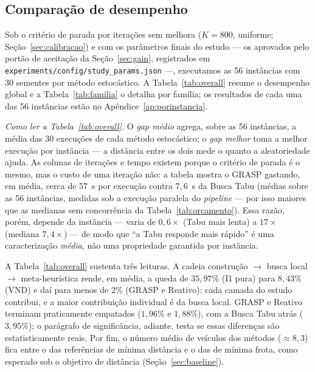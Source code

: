 \documentclass[12pt, a4paper]{article}
\newcommand{\Kgrasp}{800}
\begin{document}
\subsection{Comparação de desempenho}\label{sec:comparacao}
Sob o critério de parada por iterações sem melhora ($K=\Kgrasp$, uniforme; Seção~\ref{sec:calibracao}) e com os parâmetros finais do estudo --- os aprovados pelo portão de aceitação da Seção~\ref{sec:gain}, registrados em \texttt{experiments/config/study\_params.json} ---, executamos as 56 instâncias com 30 sementes por método estocástico. A Tabela~\ref{tab:overall} resume o desempenho global e a Tabela~\ref{tab:familia} o detalha por família; os resultados de cada uma das 56 instâncias estão no Apêndice~\ref{ap:porinstancia}.



\emph{Como ler a Tabela~\ref{tab:overall}.} O \emph{gap médio} agrega, sobre as 56 instâncias, a média das 30 execuções de cada método estocástico; o \emph{gap melhor} toma a melhor execução por instância --- a distância entre os dois mede o quanto a aleatoriedade ajuda. As colunas de iterações e tempo existem porque o critério de parada é o mesmo, mas o custo de uma iteração não: a tabela mostra o GRASP gastando, em média, cerca de $57$~s por execução contra $7{,}6$~s da Busca Tabu (médias sobre as 56 instâncias, medidas sob a execução paralela do \emph{pipeline} --- por isso maiores que as medianas sem concorrência da Tabela~\ref{tab:orcamento}). Essa razão, porém, depende da instância --- varia de $0{,}6\times$ (Tabu mais lenta) a $17\times$ (mediana $7{,}4\times$) --- de modo que ``a Tabu responde mais rápido'' é uma caracterização \emph{média}, não uma propriedade garantida por instância.

A Tabela~\ref{tab:overall} sustenta três leituras. A cadeia construção $\rightarrow$ busca local $\rightarrow$ meta-heurística rende, em média, a queda de $35{,}97\%$ (I1 pura) para $8{,}43\%$ (VND) e daí para menos de $2\%$ (GRASP e Reativo): cada camada do estudo contribui, e a maior contribuição individual é da busca local. GRASP e Reativo terminam praticamente empatados ($1{,}96\%$ e $1{,}88\%$), com a Busca Tabu atrás ($3{,}95\%$); o parágrafo de significância, adiante, testa se essas diferenças são estatisticamente reais. Por fim, o número médio de veículos dos métodos ($\approx 8{,}3$) fica entre o das referências de mínima distância e o das de mínima frota, como esperado sob o objetivo de distância (Seção~\ref{sec:baseline}).
\end{document}

